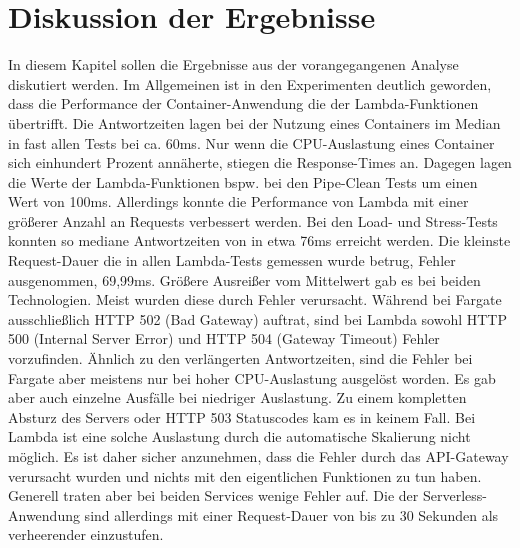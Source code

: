 \chapter{Diskussion der Ergebnisse}
In diesem Kapitel sollen die Ergebnisse aus der vorangegangenen Analyse diskutiert werden.
Im Allgemeinen ist in den Experimenten deutlich geworden, dass die Performance der Container-Anwendung die der Lambda-Funktionen übertrifft. Die Antwortzeiten lagen bei der Nutzung eines Containers im Median in fast allen Tests bei ca. 60ms. Nur wenn die CPU-Auslastung eines Container sich einhundert Prozent annäherte, stiegen die Response-Times an. Dagegen lagen die Werte der Lambda-Funktionen bspw. bei den Pipe-Clean Tests um einen Wert von 100ms. Allerdings konnte die Performance von Lambda mit einer größerer Anzahl an Requests verbessert werden. Bei den Load- und Stress-Tests konnten so mediane Antwortzeiten von in etwa 76ms erreicht werden. Die kleinste Request-Dauer die in allen Lambda-Tests gemessen wurde betrug, Fehler ausgenommen, 69,99ms. Größere Ausreißer vom Mittelwert gab es bei beiden Technologien. Meist wurden diese durch Fehler verursacht. Während bei Fargate ausschließlich HTTP 502 (Bad Gateway) auftrat, sind bei Lambda sowohl HTTP 500 (Internal Server Error) und HTTP 504 (Gateway Timeout) Fehler vorzufinden. Ähnlich zu den verlängerten Antwortzeiten, sind die Fehler bei Fargate aber meistens nur bei hoher CPU-Auslastung ausgelöst worden. Es gab aber auch einzelne Ausfälle bei niedriger Auslastung. Zu einem kompletten Absturz des Servers oder HTTP 503 Statuscodes kam es in keinem Fall. 
Bei Lambda ist eine solche Auslastung durch die automatische Skalierung nicht möglich. Es ist daher sicher anzunehmen, dass die Fehler durch das API-Gateway verursacht wurden und nichts mit den eigentlichen Funktionen zu tun haben. Generell traten aber bei beiden Services wenige Fehler auf. Die der Serverless-Anwendung sind allerdings mit einer Request-Dauer von bis zu 30 Sekunden als verheerender einzustufen.

